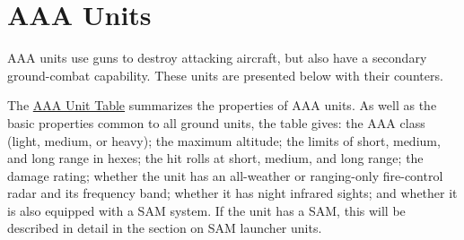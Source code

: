 
\chapter{AAA Units}


AAA units use guns to destroy attacking aircraft, but also have a secondary ground-combat capability. These units are presented below with their counters.

The \hyperlink{table:aaa-units}{AAA Unit Table} summarizes the properties of AAA units.
As well as the basic properties common to all ground units, the table gives:
the AAA class (light, medium, or heavy);
the maximum altitude;
the limits of short, medium, and long range in hexes;
the hit rolls at short, medium, and long range;
the damage rating;
whether the unit has an all-weather or ranging-only fire-control radar and its frequency band;
whether it has night infrared sights; and
whether it is also equipped with a SAM system.
If the unit has a SAM, this will be described in detail in the section on SAM launcher units.%
